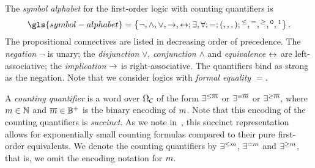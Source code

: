 
The \emph{symbol alphabet} for the first-order logic with counting quantifiers
is
\[
  \gls{symbol-alphabet} = \set{\lnot, \allconns; \allQs;
  =; (,,,); {}^{\leq}, {}^{=}, {}^{\geq}, {}^0, {}^1}.
\]
The propositional connectives are listed in decreasing order of precedence.
The \emph{negation} $\lnot$ is unary;
the \emph{disjunction} $\lor$, \emph{conjunction} $\land$ and \emph{equivalence}
$\leftrightarrow$ are left-associative; the \emph{implication} $\rightarrow$ is
right-associative. The quantifiers bind as strong as the negation.
Note that we consider logics with \emph{formal equality} $=$.

A \emph{counting quantifier} is a word over $\Omega_{\mathcal{C}}$ of the form
$\exists^{\leq\overline{m}}$ or $\exists^{=\overline{m}}$ or $\exists^{\geq\overline{m}}$,
where $m \in \mathbb{N}$ and $\overline{m} \in \mathbb{B}^+$ is the binary encoding of
$m$. Note that this encoding of the counting quantifiers is \emph{succinct}.
As we note in~, this succinct representation allows for
exponentially small counting formulas compared to their pure first-order
equivalents.
We denote the counting quantifiers by $\exists^{\leq m}$, $\exists^{=m}$ and
$\exists^{\geq m}$, that is, we omit the encoding notation for $m$.